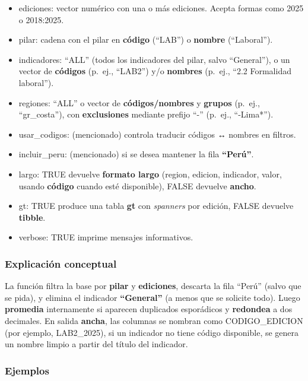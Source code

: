 \documentclass[
  11pt,
  letterpaper,
  DIV=11,
  numbers=noendperiod]{scrartcl}
\begin{document}
\begin{itemize}
\item
  ediciones: vector numérico con una o más ediciones. Acepta formas como
  2025 o 2018:2025.
\item
  pilar: cadena con el pilar en \textbf{código} (``LAB'') o
  \textbf{nombre} (``Laboral'').
\item
  indicadores: ``ALL'' (todos los indicadores del pilar, salvo
  ``General''), o un vector de \textbf{códigos} (p.~ej., ``LAB2'') y/o
  \textbf{nombres} (p.~ej., ``2.2 Formalidad laboral'').
\item
  regiones: ``ALL'' o vector de \textbf{códigos/nombres} y
  \textbf{grupos} (p.~ej., ``gr\_costa''), con \textbf{exclusiones}
  mediante prefijo ``-'' (p.~ej., ``-Lima*'').
\item
  usar\_codigos: (mencionado) controla traducir códigos ↔ nombres en
  filtros.
\item
  incluir\_peru: (mencionado) si se desea mantener la fila
  \textbf{``Perú''}.
\item
  largo: TRUE devuelve \textbf{formato largo} (region, edicion,
  indicador, valor, usando \textbf{código} cuando esté disponible),
  FALSE devuelve \textbf{ancho}.
\item
  gt: TRUE produce una tabla \textbf{gt} con \emph{spanners} por
  edición, FALSE devuelve \textbf{tibble}.
\item
  verbose: TRUE imprime mensajes informativos.
\end{itemize}

\subsubsection{\texorpdfstring{\textbf{Explicación
conceptual}}{Explicación conceptual}}\label{explicaciuxf3n-conceptual-9}

La función filtra la base por \textbf{pilar} y \textbf{ediciones},
descarta la fila ``Perú'' (salvo que se pida), y elimina el indicador
\textbf{``General''} (a menos que se solicite todo). Luego
\textbf{promedia} internamente si aparecen duplicados esporádicos y
\textbf{redondea} a dos decimales. En salida \textbf{ancha}, las
columnas se nombran como CODIGO\_EDICION (por ejemplo, LAB2\_2025), si
un indicador no tiene código disponible, se genera un nombre limpio a
partir del título del indicador.

\subsubsection{\texorpdfstring{\textbf{Ejemplos}}{Ejemplos}}\label{ejemplos-9}
\end{document}
